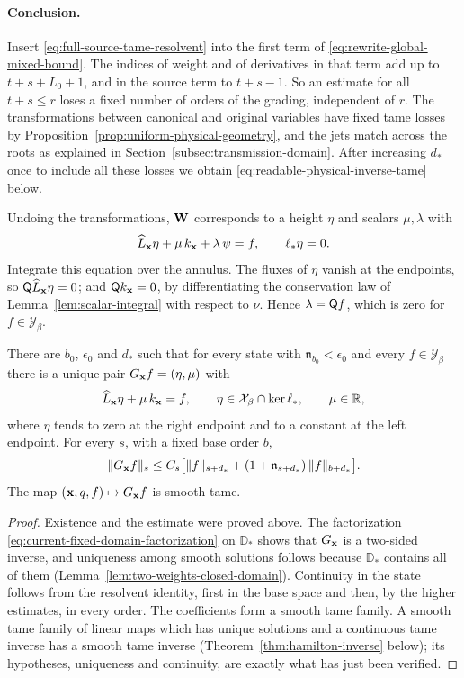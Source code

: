 \paragraph{Conclusion.}
Insert \eqref{eq:full-source-tame-resolvent} into the first term of
\eqref{eq:rewrite-global-mixed-bound}. The indices of weight and of
derivatives in that term add up to $t+s+L_0+1$, and in the source
term to $t+s-1$. So an estimate for all $t+s\le r$ loses a fixed
number of orders of the grading, independent of $r$. The
transformations between canonical and original variables have fixed
tame losses by Proposition~\ref{prop:uniform-physical-geometry}, and
the jets match across the roots as explained in
Section~\ref{subsec:transmission-domain}. After increasing $d_*$ once
to include all these losses we obtain
\eqref{eq:readable-physical-inverse-tame} below.

Undoing the transformations, $\mathbf W$ corresponds to a height $\eta$ and
scalars $\mu,\lambda$ with
\[
 \widehat L_{\mathbf x}\eta+\mu\,k_{\mathbf x}+\lambda\,\psi=f,
 \qquad \ell_*\eta=0 .
\]
Integrate this equation over the annulus. The fluxes of $\eta$ vanish
at the endpoints, so $\mathsf Q\widehat L_{\mathbf x}\eta=0$; and
$\mathsf Q k_{\mathbf x}=0$, by differentiating the conservation law of
Lemma~\ref{lem:scalar-integral} with respect to $\nu$. Hence
$\lambda=\mathsf Q f$, which is zero for $f\in\mathcal Y_\beta$.

\begin{proposition}
\label{prop:rewrite-volume-inverse}
There are $b_0$, $\epsilon_0$ and $d_*$ such that for every state
with $\mathfrak n_{b_0}<\epsilon_0$ and every $f\in\mathcal Y_\beta$
there is a unique pair $G_{\mathbf x}f=(\eta,\mu)$ with
\[
 \widehat L_{\mathbf x}\eta+\mu\,k_{\mathbf x}=f,\qquad
 \eta\in\mathcal X_\beta\cap\ker\ell_*,\qquad \mu\in\mathbb R ,
\]
where $\eta$ tends to zero at the right endpoint and to a constant at
the left endpoint. For every $s$, with a fixed base order $b$,
\begin{equation}\label{eq:readable-physical-inverse-tame}
 \|G_{\mathbf x}f\|_s
 \le C_s\bigl[\|f\|_{s+d_*}
       +(1+\mathfrak n_{s+d_*})\,\|f\|_{b+d_*}\bigr] .
\end{equation}
The map $(\mathbf x,q,f)\mapsto G_{\mathbf x}f$ is smooth tame.
\end{proposition}

\begin{proof}
Existence and the estimate were proved above. The factorization
\eqref{eq:current-fixed-domain-factorization} on $\mathbb D_*$ shows
that $G_{\mathbf x}$ is a two-sided inverse, and uniqueness among smooth
solutions follows because $\mathbb D_*$ contains all of them
(Lemma~\ref{lem:two-weights-closed-domain}). Continuity in the state
follows from the resolvent identity, first in the base space and
then, by the higher estimates, in every order. The coefficients form
a smooth tame family. A smooth tame family of linear maps which has
unique solutions and a continuous tame inverse has a smooth tame
inverse (Theorem~\ref{thm:hamilton-inverse} below); its hypotheses,
uniqueness and continuity, are exactly what has just been verified.
\end{proof}
